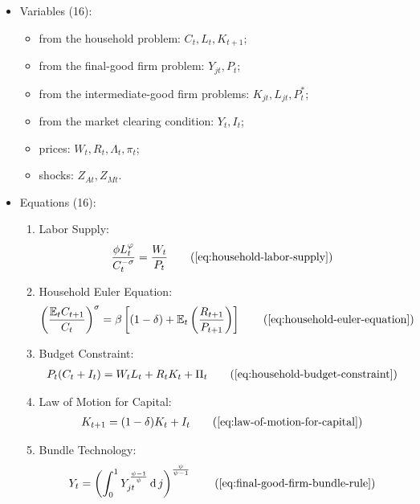 \documentclass[
	thesis.tex
	]{subfiles}
\begin{document}
{\singlespacing
	
	\begin{itemize}
		\item Variables (16):
		
		\begin{itemize}
			\item from the household problem: $C_t, L_t, K_{t+1}$;
			\item from the final-good firm problem: $Y_{jt}, P_t$;
			\item from the intermediate-good firm problems: $K_{jt}, L_{jt}, P_t^\ast$;
			\item from the market clearing condition: $Y_t, I_t$;
			\item prices: $W_t, R_t, \Lambda_t, \pi_t$;
			\item shocks: $Z_{At}, Z_{Mt}$.
		\end{itemize}
		\item Equations (16):
		
		\begin{enumerate}
			\item Labor Supply:
			\begin{align}
				\frac{\phi L_t^{\varphi}}{C_t^{-\sigma}} = \frac{W_t}{P_t}
				\tag{\ref{eq:household-labor-supply}}
			\end{align}
			
			\item Household Euler Equation:
			\begin{align}
				\left( \frac{\mathbb{E}_t C_{t+1}}{C_t} \right)^\sigma = \beta \left[ (1-\delta) + \mathbb{E}_t \left(\frac{R_{t+1}}{P_{t+1}}\right) \right]
				\tag{\ref{eq:household-euler-equation}}
			\end{align}
			
			\item Budget Constraint: 
			\begin{align}
				P_t (C_t + I_t) = W_t L_t + R_t K_t + \Pi_t
				\tag{\ref{eq:household-budget-constraint}}
			\end{align}
			
			\item Law of Motion for Capital:
			\begin{align}
				K_{t+1} = (1-\delta)K_t + I_t
				\tag{\ref{eq:law-of-motion-for-capital}}
			\end{align}
			
			\item Bundle Technology:
			\begin{align}
				Y_t = \left( \int_{0}^{1} Y_{jt}^{\frac{\psi-1}{\psi}} \dif j \right)^{\frac{\psi}{\psi-1}}
				\tag{\ref{eq:final-good-firm-bundle-rule}}
			\end{align}
			

\end{enumerate}
\end{itemize}}
\end{document}
